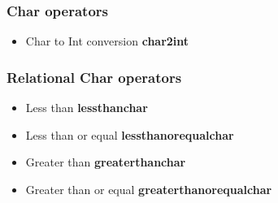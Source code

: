 \documentclass[12pt]{article}
\begin{document}
\begin{tabular}{c}
\end{tabular}

\subsubsection{Char operators}
\begin{itemize}
\item Char to Int conversion \textbf{char2int}
\end{itemize}

\subsubsection{Relational Char operators}
\begin{itemize}
\item Less than   			  \textbf{lessthanchar} 
\item Less than or equal   \textbf{lessthanorequalchar} 
\item Greater than			  \textbf{greaterthanchar} 
\item Greater than or equal  \textbf{greaterthanorequalchar} 
\end{itemize}
\end{document}
